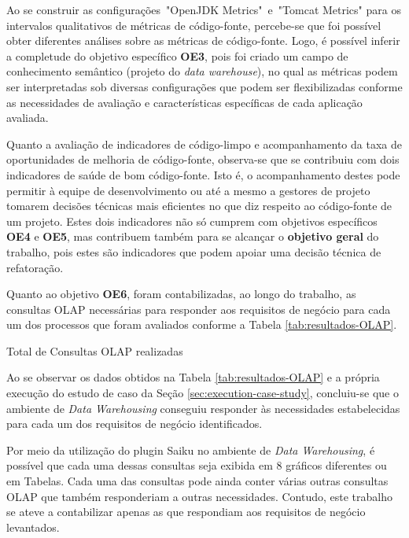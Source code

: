 Ao se construir as  configurações~"OpenJDK Metrics"~e~"Tomcat Metrics" para os intervalos qualitativos de métricas de código-fonte, percebe-se que foi possível obter diferentes análises sobre as métricas de código-fonte. Logo, é possível inferir a completude do objetivo específico \textbf{OE3}, pois foi criado um campo de conhecimento semântico (projeto do \textit{data warehouse}), no qual as métricas podem ser interpretadas sob diversas configurações que podem ser flexibilizadas conforme as necessidades de avaliação e características específicas de cada aplicação avaliada.

Quanto a avaliação de indicadores de código-limpo e acompanhamento da taxa de oportunidades de melhoria de código-fonte, observa-se que se contribuiu com dois indicadores de saúde de bom código-fonte. Isto é, o acompanhamento destes pode permitir à equipe de desenvolvimento ou até a mesmo a gestores de projeto tomarem decisões técnicas mais eficientes no que diz respeito ao código-fonte de um projeto. Estes dois indicadores não só cumprem com objetivos específicos \textbf{OE4} e \textbf{OE5}, mas contribuem também para se alcançar o \textbf{objetivo geral} do trabalho, pois estes são indicadores que podem apoiar uma decisão técnica de refatoração.

Quanto ao objetivo \textbf{OE6}, foram contabilizadas, ao longo do trabalho, as consultas OLAP necessárias para responder aos requisitos de negócio para cada um dos processos que foram avaliados conforme a Tabela \ref{tab:resultados-OLAP}.

 
\begin{table}[H]
\begin{center}

\caption{Total de Consultas OLAP realizadas}
\label{tab:resultados-OLAP}
\end{center}
\end{table}
\FloatBarrier


Ao se observar os dados obtidos na Tabela \ref{tab:resultados-OLAP} e a própria execução do estudo de caso da Seção \ref{sec:execution-case-study}, concluiu-se que o ambiente de \textit{Data Warehousing} conseguiu responder às necessidades estabelecidas para cada um dos requisitos de negócio identificados. 

Por meio da utilização do plugin Saiku no ambiente de \textit{Data Warehousing}, é possível que cada uma dessas consultas seja exibida em 8 gráficos diferentes ou em Tabelas. Cada uma das consultas pode ainda conter várias outras consultas OLAP que também responderiam a outras necessidades. Contudo, este trabalho se ateve a contabilizar apenas as que respondiam aos requisitos de negócio levantados.

